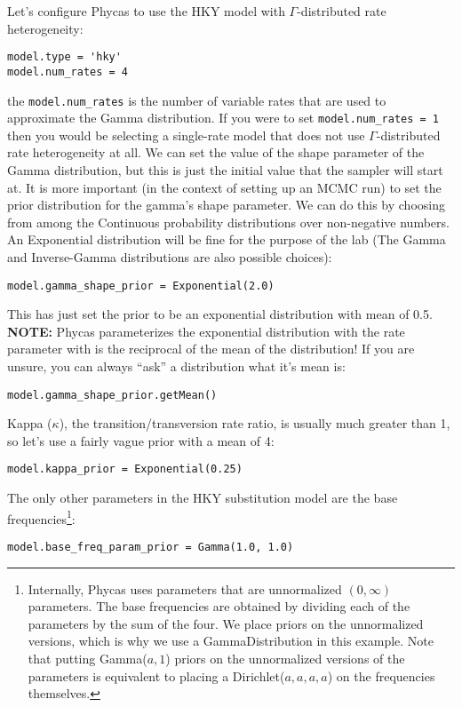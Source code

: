 \documentclass{article}
\newcommand{\cmd}[1]{\texttt{#1}\xspace}
\newcommand{\phycas}{Phycas\xspace}
\begin{document}
Let's configure \phycas to use the HKY model with $\Gamma$-distributed rate heterogeneity:

\begin{verbatim}
model.type = 'hky'
model.num_rates = 4
\end{verbatim}
the \cmd{model.num\_rates} is the number of variable rates that are used to approximate the Gamma distribution. 
If you were to set \cmd{model.num\_rates = 1} then you would be selecting a single-rate model that does not use $\Gamma$-distributed rate heterogeneity at all.
We can set the value of the shape parameter of the Gamma distribution, but this is just the initial value that the sampler will start at.  
It is more important (in the context of setting up an MCMC run) to set the prior distribution for the gamma's shape parameter.
We can do this by choosing from among the Continuous probability distributions over non-negative numbers.
An Exponential distribution will be fine for the purpose of the lab (The Gamma and Inverse-Gamma distributions are also possible choices):
\begin{verbatim}
model.gamma_shape_prior = Exponential(2.0)
\end{verbatim}
This has just set the prior to be an exponential distribution with mean of 0.5.
\\{\bf NOTE:}  \phycas parameterizes the exponential distribution with the rate parameter with is the reciprocal of the mean of the distribution!
If you are unsure, you can always ``ask'' a distribution what it's mean is:
\begin{verbatim}
model.gamma_shape_prior.getMean()
\end{verbatim}


Kappa ($\kappa$), the transition/transversion rate ratio, is usually much greater than 1, so let's use a fairly vague prior with a mean of 4:
\begin{verbatim}
model.kappa_prior = Exponential(0.25)
\end{verbatim}

The only other parameters in the HKY substitution model are the base frequencies\footnote{
Internally, \phycas uses parameters that are unnormalized $(0,\infty)$ parameters.
The base frequencies are obtained by dividing each of the parameters by the sum of the four.
We place priors on the unnormalized versions, which is why we use a GammaDistribution in this example.
Note that putting Gamma($a,1$) priors on the unnormalized versions of the parameters is 
equivalent to placing a Dirichlet($a,a,a,a$) on the frequencies themselves.
}:
\begin{verbatim}
model.base_freq_param_prior = Gamma(1.0, 1.0)
\end{verbatim}
\end{document}
